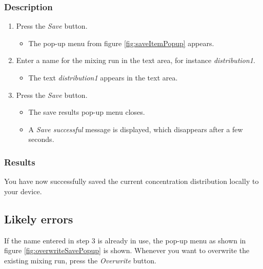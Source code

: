 \subsubsection{Description}
\begin{enumerate}
	\item Press the \emph{Save} button.
		\begin{itemize}
			\item The pop-up menu from figure \ref{fig:saveItemPopup} appears.
		\end{itemize}
	\item Enter a name for the mixing run in the text area, for instance \emph{distribution1}.
		\begin{itemize}
			\item The text \emph{distribution1} appears in the text area.
		\end{itemize}
	\item Press the \emph{Save} button.
		\begin{itemize}
			\item The save results pop-up menu closes.
			\item A \emph{Save successful} message is displayed, which disappears after a few seconds.
		\end{itemize}
\end{enumerate}

\subsubsection{Results}
You have now successfully saved the current concentration distribution locally to your device.

\subsection{Likely errors}
If the name entered in step 3 is already in use, the pop-up menu as shown in figure \ref{fig:overwriteSavePopup} is shown. Whenever you want to overwrite the existing mixing run, press the \emph{Overwrite} button.


